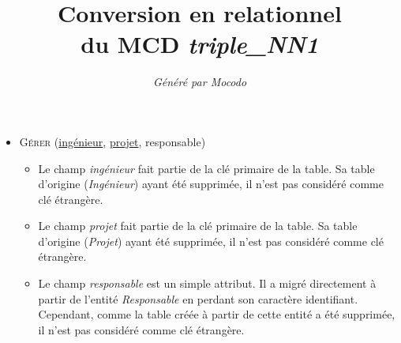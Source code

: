 \documentclass[a4paper]{article}
\title{Conversion en relationnel\\du MCD \emph{triple_NN1}}
\author{\emph{Généré par Mocodo}}
\newcommand{\relat}[1]{\textsc{#1}}
\newcommand{\attr}[1]{#1}
\newcommand{\prim}[1]{\uline{#1}}
\begin{document}
\maketitle

\begin{itemize}
  \item \relat{Gérer} (\prim{ingénieur}, \prim{projet}, \attr{responsable})
  \begin{itemize}
    \item Le champ \emph{ingénieur} fait partie de la clé primaire de la table. Sa table d'origine (\emph{Ingénieur}) ayant été supprimée, il n'est pas considéré comme clé étrangère.
    \item Le champ \emph{projet} fait partie de la clé primaire de la table. Sa table d'origine (\emph{Projet}) ayant été supprimée, il n'est pas considéré comme clé étrangère.
    \item Le champ \emph{responsable} est un simple attribut. Il a migré directement à partir de l'entité \emph{Responsable} en perdant son caractère identifiant. Cependant, comme la table créée à partir de cette entité a été supprimée, il n'est pas considéré comme clé étrangère.
  \end{itemize}

\end{itemize}
\end{document}
